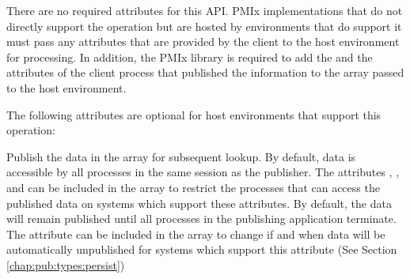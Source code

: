 \begin{arglist}
\end{arglist}
%
\returnsimple
%
\reqattrstart
There are no required attributes for this \ac{API}. \ac{PMIx} implementations that do not directly support the operation but are hosted by environments that do support it must pass any attributes that are provided by the client to the host environment for processing. In addition, the \ac{PMIx} library is required to add the  and the  attributes of the client process that published the information to the  array passed to the host environment.
\reqattrend

\optattrstart
The following attributes are optional for host environments that support this operation:


\optattrend

\descr

Publish the data in the  array for subsequent lookup.
By default, data is accessible by all processes in the same session as the publisher.  
The attributes , 
,  and  
can be included in the  array to restrict the processes that can access the published data on systems 
which support these attributes.  
By default, the data will remain published until
all processes in the publishing application terminate.  The attribute  
can be included in the  array to change if and when data will be automatically 
unpublished for systems which support this attribute (See Section \ref{chap:pub:types:persist})

